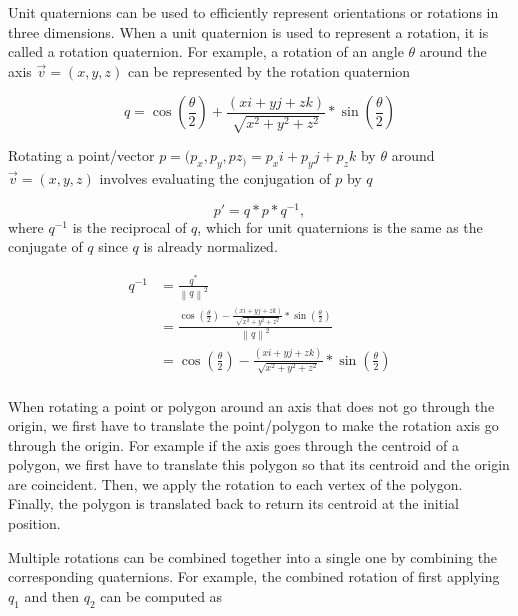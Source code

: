 Unit quaternions can be used to efficiently represent orientations or rotations in three dimensions. When a unit quaternion is used to represent a rotation, it is called a rotation quaternion. For example, a rotation of an angle \( \theta \) around the axis \( \vec{v} = (x, y, z) \) can be represented by the rotation quaternion

\begin{equation}
    q = \cos(\frac{\theta}{2}) + \frac{(xi + yj + zk)}{\sqrt{x^2 + y^2 + z^2}}*\sin(\frac{\theta}{2})
\end{equation}

Rotating a point/vector \( p = (p_x, p_y, pz_) = p_xi + p_yj + p_zk \) by \( \theta \) around \( \vec{v} = (x, y, z) \) involves evaluating the conjugation of \( p \) by \( q \) 

\begin{equation}
    p' = q*p*q^{-1}, 
\end{equation}
where \( q^{-1} \) is the reciprocal of \( q \), which for unit quaternions is the same as the conjugate of \( q \) since \( q \) is already normalized.

\begin{equation}
\begin{split}
    q^{-1} & = \frac{q^{\ast}}{{\left \| q \right \|}^2} \\
            & = \frac{\cos(\frac{\theta}{2}) - \frac{(xi + yj + zk)}{\sqrt{x^2 + y^2 + z^2}}*\sin(\frac{\theta}{2})}{{\left \| q \right \|}^2} \\
            & = \cos(\frac{\theta}{2}) - \frac{(xi + yj + zk)}{\sqrt{x^2 + y^2 + z^2}}*\sin(\frac{\theta}{2}) \\
\end{split}
\end{equation}

When rotating a point or polygon around an axis that does not go through the origin, we first have to translate the point/polygon to make the rotation axis go through the origin. For example if the axis goes through the centroid of a polygon, we first have to translate this polygon so that its centroid and the origin are coincident. Then, we apply the rotation to each vertex of the polygon. Finally, the polygon is translated back to return its centroid at the initial position.

Multiple rotations can be combined together into a single one by combining the corresponding quaternions. For example, the combined rotation of first applying \( q_1 \) and then \( q_2 \) can be computed as 

